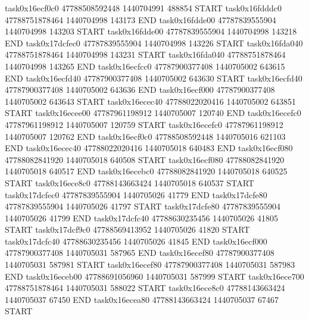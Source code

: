 task0x16ecf0c0 47788508592448          1440704991               488854  START
task0x16fdddc0 47788751878464          1440704998               143173  END
task0x16fdde00 47787839555904          1440704998               143203  START
task0x16fdde00 47787839555904          1440704998               143218  END
task0x17dcfec0 47787839555904          1440704998               143226  START
task0x16fda040 47788751878464          1440704998               143231  START
task0x16fda040 47788751878464          1440704998               143265  END
task0x16ecfcc0 47787900377408          1440705002               643615  END
task0x16ecfd40 47787900377408          1440705002               643630  START
task0x16ecfd40 47787900377408          1440705002               643636  END
task0x16ecf000 47787900377408          1440705002               643643  START
task0x16ecec40 47788022020416          1440705002               643851  START
task0x16ecee00 47787961198912          1440705007               120740  END
task0x16ecefc0 47787961198912          1440705007               120759  START
task0x16ecefc0 47787961198912          1440705007               120762  END
task0x16ecf0c0 47788508592448          1440705016               621103  END
task0x16ecec40 47788022020416          1440705018               640483  END
task0x16ecf080 47788082841920          1440705018               640508  START
task0x16ecf080 47788082841920          1440705018               640517  END
task0x16ecebc0 47788082841920          1440705018               640525  START
task0x16ece8c0 47788143663424          1440705018               640537  START
task0x17dcfec0 47787839555904          1440705026                41779  END
task0x17dcfe80 47787839555904          1440705026                41797  START
task0x17dcfe80 47787839555904          1440705026                41799  END
task0x17dcfc40 47788630235456          1440705026                41805  START
task0x17dcf9c0 47788569413952          1440705026                41820  START
task0x17dcfc40 47788630235456          1440705026                41845  END
task0x16ecf000 47787900377408          1440705031               587965  END
task0x16ecef80 47787900377408          1440705031               587981  START
task0x16ecef80 47787900377408          1440705031               587983  END
task0x16eceb00 47788691056960          1440705031               587999  START
task0x16ece700 47788751878464          1440705031               588022  START
task0x16ece8c0 47788143663424          1440705037                67450  END
task0x16ecea80 47788143663424          1440705037                67467  START
